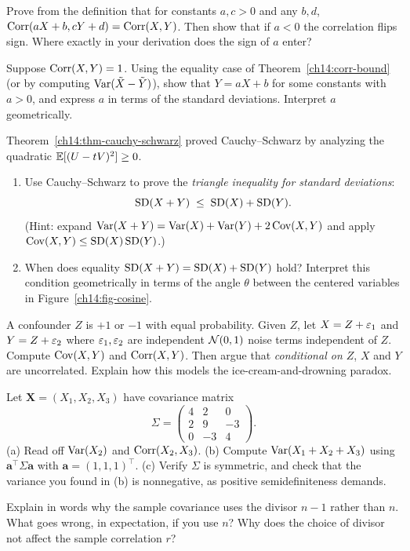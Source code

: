 \begin{exercise}
\label{ch14:ex-scale}
Prove from the definition that for constants $a, c > 0$ and any $b, d$,
$\operatorname{Corr}(aX + b, cY + d) = \operatorname{Corr}(X, Y)$. Then show that if $a < 0$ the correlation
flips sign. Where exactly in your derivation does the sign of $a$ enter?
\end{exercise}

\begin{exercise}
\label{ch14:ex-one}
Suppose $\operatorname{Corr}(X, Y) = 1$. Using the equality case of
Theorem~\ref{ch14:corr-bound} (or by computing $\operatorname{Var}(\tilde X - \tilde Y)$), show
that $Y = aX + b$ for some constants with $a > 0$, and express $a$ in terms of the
standard deviations. Interpret $a$ geometrically.
\end{exercise}

\begin{exercise}
\label{ch14:ex-cs}
Theorem~\ref{ch14:thm-cauchy-schwarz} proved Cauchy--Schwarz by analyzing the quadratic $\operatorname{\mathbb{E}}[(U - tV)^2] \ge 0$.
\begin{enumerate}[label=(\alph*)]
\item Use Cauchy--Schwarz to prove the \emph{triangle inequality for standard deviations}:
\[
\operatorname{SD}(X + Y) \;\le\; \operatorname{SD}(X) + \operatorname{SD}(Y).
\]
(Hint: expand $\operatorname{Var}(X+Y) = \operatorname{Var}(X) + \operatorname{Var}(Y) + 2\operatorname{Cov}(X,Y)$ and apply $\operatorname{Cov}(X,Y) \le \operatorname{SD}(X)\operatorname{SD}(Y)$.)
\item When does equality $\operatorname{SD}(X + Y) = \operatorname{SD}(X) + \operatorname{SD}(Y)$ hold? Interpret this condition geometrically in terms of the angle $\theta$ between the centered variables in Figure~\ref{ch14:fig-cosine}.
\end{enumerate}
\end{exercise}

\begin{exercise}
\label{ch14:ex-confound}
A confounder $Z$ is $+1$ or $-1$ with equal probability. Given $Z$, let
$X = Z + \varepsilon_1$ and $Y = Z + \varepsilon_2$ where $\varepsilon_1, \varepsilon_2$ are independent
$\mathcal{N}(0, 1)$ noise terms independent of $Z$. Compute $\operatorname{Cov}(X, Y)$ and
$\operatorname{Corr}(X, Y)$. Then argue that \emph{conditional on $Z$}, $X$ and $Y$ are
uncorrelated. Explain how this models the ice-cream-and-drowning paradox.
\end{exercise}

\begin{exercise}
\label{ch14:ex-matrix}
Let $\mathbf{X} = (X_1, X_2, X_3)$ have covariance matrix
\[
\Sigma = \begin{pmatrix} 4 & 2 & 0 \\ 2 & 9 & -3 \\ 0 & -3 & 4 \end{pmatrix}.
\]
(a) Read off $\operatorname{Var}(X_2)$ and $\operatorname{Corr}(X_2, X_3)$. (b) Compute $\operatorname{Var}(X_1 + X_2 + X_3)$
using $\mathbf{a}^\top \Sigma \mathbf{a}$ with $\mathbf{a} = (1,1,1)^\top$.
(c) Verify $\Sigma$ is symmetric, and check that the variance you found in (b) is
nonnegative, as positive semidefiniteness demands.
\end{exercise}

\begin{exercise}
\label{ch14:ex-bessel}
Explain in words why the sample covariance uses the divisor $n - 1$ rather than $n$.
What goes wrong, in expectation, if you use $n$? Why does the choice of divisor not
affect the sample correlation $r$?
\end{exercise}
